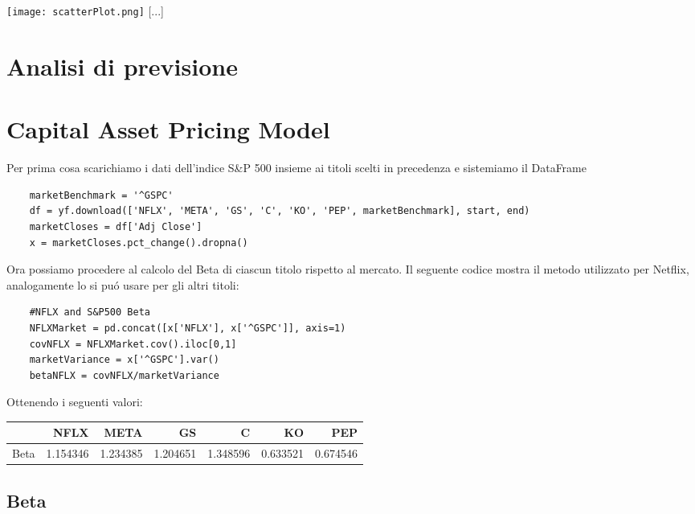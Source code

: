 \documentclass{report}
\begin{document}
\texttt{[image: scatterPlot.png]}
[...]
\chapter{Analisi di previsione}
\chapter{Capital Asset Pricing Model}
Per prima cosa scarichiamo i dati dell'indice S&P 500 insieme ai titoli scelti in precedenza e sistemiamo il DataFrame
\begin{lstlisting}
    marketBenchmark = '^GSPC'
    df = yf.download(['NFLX', 'META', 'GS', 'C', 'KO', 'PEP', marketBenchmark], start, end)
    marketCloses = df['Adj Close']
    x = marketCloses.pct_change().dropna()
\end{lstlisting}
Ora possiamo procedere al calcolo del Beta di ciascun titolo rispetto al mercato. Il seguente codice mostra il metodo utilizzato per Netflix, analogamente lo si puó usare per gli altri titoli:
\begin{lstlisting}
    #NFLX and S&P500 Beta
    NFLXMarket = pd.concat([x['NFLX'], x['^GSPC']], axis=1)
    covNFLX = NFLXMarket.cov().iloc[0,1]
    marketVariance = x['^GSPC'].var()
    betaNFLX = covNFLX/marketVariance
\end{lstlisting}
Ottenendo i seguenti valori: 

\begin{tabular}{lrrrrrr}
\toprule
{} &     NFLX &     META &      GS &        C &       KO &      PEP \\
\midrule
Beta &  1.154346 &  1.234385 &  1.204651 &  1.348596 &  0.633521 &  0.674546 \\

\bottomrule
\end{tabular}

\section{Beta}

\tableofcontents
\end{document}
